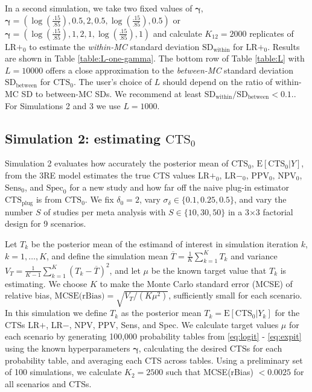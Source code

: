 \documentclass[AMA,STIX1COL]{WileyNJD-v2}
\newcommand{\E}{\mbox{E}}
\newcommand{\boldgamma}{\boldsymbol{\gamma}}
\newcommand{\CTSo}{\text{CTS}_0}
\newcommand{\CTSp}{\text{CTS}_{\text{plug}}}
\begin{document}
In a second simulation, we take two fixed values of $\boldgamma$, $\boldgamma = (\log(\frac{.15}{.85}), 0.5, 2, 0.5, \log(\frac{.15}{.85}), 0.5)$ or $\boldgamma = (\log(\frac{.15}{.85}), 1, 2, 1, \log(\frac{.15}{.85}), 1)$ and calculate  $K_{12} = 2000$ replicates of $\text{LR}+_0$ to estimate the \textit{within-MC} standard deviation $\text{SD}_{\text{within}}$ for $\text{LR}+_0$. Results are shown in Table \ref{table:L-one-gamma}. The bottom row of Table \ref{table:L} with $L = 10000$ offers a close approximation to the \textit{between-MC} standard deviation $\text{SD}_{\text{between}}$ for $\CTSo$. The user's choice of $L$ should depend on the ratio of within-MC SD to between-MC SDs. We recommend at least $\text{SD}_{\text{within}} / \text{SD}_{\text{between}} < 0.1$.. For Simulations 2 and 3 we use $L = 1000$. 


\subsection{Simulation 2: estimating $\CTSo$} \label{sec:sim_CTS}

Simulation 2 evaluates how accurately the posterior mean of $\CTSo$, $\text{E}[\CTSo \vert Y]$, from the 3RE model estimates the true CTS values LR$+_0$, LR$-_0$, $\text{PPV}_0$, $\text{NPV}_0$, $\text{Sens}_0$, and $\text{Spec}_0$ for a new study and how far off the naive plug-in estimator $\CTSp$ is from $\CTSo$. We fix $\delta_0 = 2$, vary $\sigma_{\delta} \in \{0.1, 0.25, 0.5\}$, and vary the number $S$ of studies per meta analysis with $S \in \{10, 30, 50\}$ in a 3$\times$3 factorial design for 9 scenarios. 

Let $T_k$ be the posterior mean of the estimand of interest in simulation iteration $k$, $k = 1, \dots, K$, and define the simulation mean $\overline{T} = \frac{1}{K}\sum_{k=1}^K T_k$ and variance $V_T = \frac{1}{K - 1}\sum_{k=1}^K (T_k - \overline{T})^2$, and let $\mu$ be the known target value that $T_k$ is estimating. We choose $K$ to make the Monte Carlo standard error (MCSE) of relative bias, $\mbox{MCSE(rBias)} = \sqrt{V_T / (K\mu^2)}$, sufficiently small for each scenario. In this simulation we define $T_k$ as the posterior mean $T_k = \E[\CTSo \vert Y_k]$ for the CTSs LR$+$, LR$-$, NPV, PPV, Sens, and Spec. We calculate target values $\mu$ for each scenario by generating 100,000 probability tables from \eqref{eq:logit} - \eqref{eq:expit} using the known hyperparameters $\boldgamma$, calculating the desired CTSs for each probability table, and averaging each CTS across tables. Using a preliminary set of 100 simulations, we calculate $K_2 = 2500$ such that MCSE(rBias) $< 0.0025$ for all scenarios and CTSs. 
\end{document}
